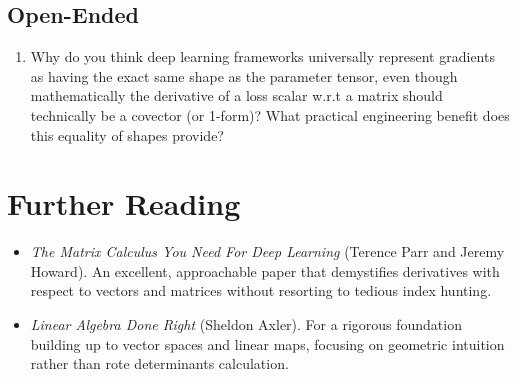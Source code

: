 \subsection*{Open-Ended}
\begin{enumerate}
  \item Why do you think deep learning frameworks universally represent gradients as having the exact same shape as the parameter tensor, even though mathematically the derivative of a loss scalar w.r.t a matrix should technically be a covector (or 1-form)? What practical engineering benefit does this equality of shapes provide?
\end{enumerate}

\section{Further Reading}
\label{ch:02:sec:further}

\begin{itemize}
  \item \textit{The Matrix Calculus You Need For Deep Learning} (Terence Parr and Jeremy Howard). An excellent, approachable paper that demystifies derivatives with respect to vectors and matrices without resorting to tedious index hunting.
  \item \textit{Linear Algebra Done Right} (Sheldon Axler). For a rigorous foundation building up to vector spaces and linear maps, focusing on geometric intuition rather than rote determinants calculation.
\end{itemize}
